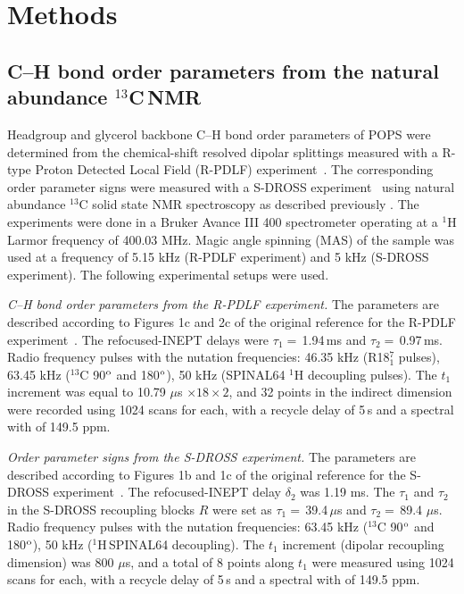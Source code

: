 \documentclass[aps,prl,superscriptaddress,twocolumn]{revtex4}
\begin{document}
\section{Methods}

\subsection{C--H bond order parameters from the natural abundance $^{13}$C\,NMR}

Headgroup and glycerol backbone C--H bond order parameters of POPS
were determined from the chemical-shift resolved dipolar splittings
measured with a R-type Proton Detected Local Field (R-PDLF) experiment~\cite{dvinskikh04}.
The corresponding order parameter signs were measured with a S-DROSS experiment~\cite{gross97}
using natural abundance $^{13}$C solid state NMR spectroscopy as described previously \cite{ferreira13,ferreira16}.
The experiments were done in a Bruker Avance III 400 spectrometer operating at a $^1$H Larmor frequency of 400.03 MHz.
Magic angle spinning (MAS) of the sample was used at a frequency of 5.15 kHz (R-PDLF experiment) and 5 kHz (S-DROSS experiment).
The following experimental setups were used.

{\emph{C--H bond order parameters from the R-PDLF experiment.}} The parameters are described according to Figures 1c and 2c of the original reference
for the R-PDLF experiment~\cite{dvinskikh04}.  The refocused-INEPT delays were $\tau_1=$\,1.94\,ms and $\tau_2=$\,0.97\,ms.
Radio frequency pulses with the nutation frequencies: 46.35 kHz (R18$^7_1$ pulses), 63.45 kHz ($^{13}$C 90$^{\rm{o}}$ and 180$^{\rm{o}}$),
50 kHz (SPINAL64 $^1$H decoupling pulses).
The $t_1$ increment was equal to 10.79 $\mu$s $\times18\times2$, and 32 points in the indirect
dimension were recorded using 1024 scans for each, with a recycle delay of 5\,s and a spectral with  of 149.5 ppm.

\emph{Order parameter signs from the S-DROSS experiment.}
The parameters are described according to Figures 1b and 1c of the original reference for the S-DROSS
experiment~\cite{gross97}. The refocused-INEPT delay $\delta_2$ was 1.19 ms. The $\tau_1$ and $\tau_2$ in the S-DROSS recoupling
blocks $R$ were set as $\tau_1=$\,39.4\,$\mu$s and $\tau_2=$\,89.4 $\mu$s. Radio frequency pulses with the nutation
frequencies: 63.45 kHz ($^{13}$C 90$^{\rm{o}}$ and 180$^{\rm{o}}$), 50 kHz ($^1$H\,SPINAL64 decoupling).
The $t_1$ increment (dipolar recoupling dimension) was 800 $\mu$s, and a total of 8 points along $t_1$ were
measured using 1024 scans for each, with a recycle delay of 5\,s and a spectral with   of 149.5 ppm.
\end{document}

